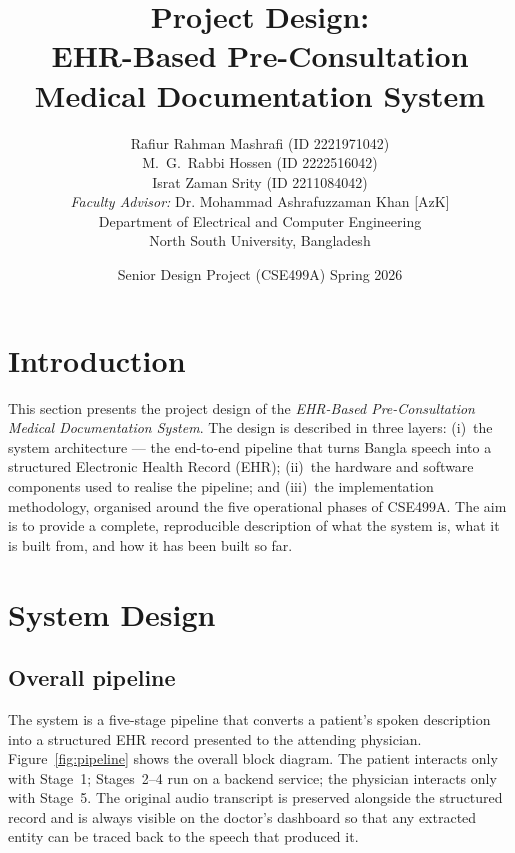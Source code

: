 \documentclass[12pt,a4paper]{article}
\title{\bfseries Project Design:\\
EHR-Based Pre-Consultation Medical Documentation System}
\author{Rafiur Rahman Mashrafi (ID 2221971042)\\
        M.~G.~Rabbi Hossen (ID 2222516042)\\
        Israt Zaman Srity (ID 2211084042)\\[6pt]
        \emph{Faculty Advisor:} Dr. Mohammad Ashrafuzzaman Khan [AzK]\\
        Department of Electrical and Computer Engineering\\
        North South University, Bangladesh}
\date{Senior Design Project (CSE499A) \quad Spring 2026}
\begin{document}
\maketitle

\section{Introduction}

This section presents the project design of the
\textit{EHR-Based Pre-Consultation Medical Documentation System}.
The design is described in three layers: (i)~the system architecture
--- the end-to-end pipeline that turns Bangla speech into a
structured Electronic Health Record (EHR); (ii)~the hardware and
software components used to realise the pipeline; and (iii)~the
implementation methodology, organised around the five operational
phases of CSE499A. The aim is to provide a complete, reproducible
description of what the system is, what it is built from, and how
it has been built so far.

\section{System Design}

\subsection{Overall pipeline}
The system is a five-stage pipeline that converts a patient's spoken
description into a structured EHR record presented to the attending
physician. Figure~\ref{fig:pipeline} shows the overall block
diagram. The patient interacts only with Stage~1; Stages~2--4 run on
a backend service; the physician interacts only with Stage~5. The
original audio transcript is preserved alongside the structured
record and is always visible on the doctor's dashboard so that any
extracted entity can be traced back to the speech that produced it.
\end{document}
